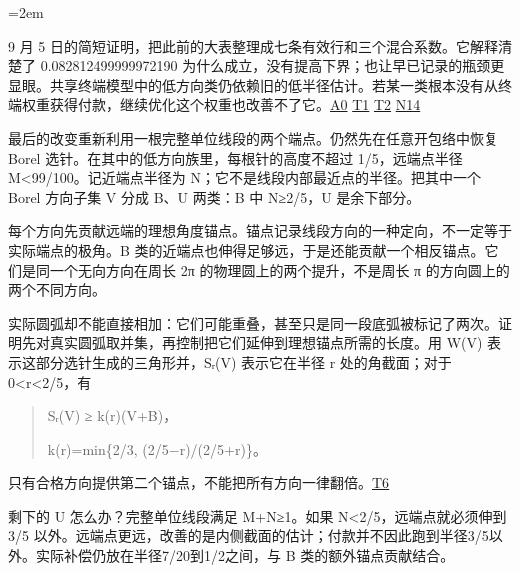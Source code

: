 {\emergencystretch=2em

9 月 5 日的简短证明，把此前的大表整理成七条有效行和三个混合系数。它解释清楚了 \allowbreak{}0.082812499999972190 为什么成立，没有提高下界；也让早已记录的瓶颈更显眼。共享终端模型中的低方向类仍依赖旧的低半径估计。若某一类根本没有从终端权重获得付款，继续优化这个权重也改善不了它。\href{https://github.com/subfish-zhou/star-shaped-kakeya-lean/blob/6432d8eb33cc2093ed5ca1f5e63390e4bf065fd0/history-sources/A0-baseline.md}{A0} \href{https://github.com/subfish-zhou/star-shaped-kakeya-lean/blob/6432d8eb33cc2093ed5ca1f5e63390e4bf065fd0/history/one-tenth/baseline/PROOF.md}{T1} \href{https://github.com/subfish-zhou/star-shaped-kakeya-lean/blob/6432d8eb33cc2093ed5ca1f5e63390e4bf065fd0/history/one-tenth/baseline/PROVENANCE.md}{T2} \href{https://github.com/subfish-zhou/star-shaped-kakeya-lean/blob/6432d8eb33cc2093ed5ca1f5e63390e4bf065fd0/history/shared-terminal-082812/class_independent_terminal_price_report_zh.md}{N14}

\par}

最后的改变重新利用一根完整单位线段的两个端点。仍然先在任意开包络中恢复 Borel 选针。在其中的低方向族里，每根针的高度不超过 1/5，远端点半径 M\textless99/100。记近端点半径为 N；它不是线段内部最近点的半径。把其中一个 Borel 方向子集 V 分成 B、U 两类：B 中 N≥2/5，U 是余下部分。

每个方向先贡献远端的理想角度锚点。锚点记录线段方向的一种定向，不一定等于实际端点的极角。B 类的近端点也伸得足够远，于是还能贡献一个相反锚点。它们是同一个无向方向在周长 2π 的物理圆上的两个提升，不是周长 π 的方向圆上的两个不同方向。

实际圆弧却不能直接相加：它们可能重叠，甚至只是同一段底弧被标记了两次。证明先对真实圆弧取并集，再控制把它们延伸到理想锚点所需的长度。用 W(V) 表示这部分选针生成的三角形并，Sᵣ(V) 表示它在半径 r 处的角截面；对于 0\textless r\textless2/5，有

\begin{quote}
\textbar Sᵣ(V)\textbar{} ≥ k(r)(\textbar V\textbar+\textbar B\textbar)，

k(r)=min\{2/3, (2/5−r)/(2/5+r)\}。
\end{quote}

只有合格方向提供第二个锚点，不能把所有方向一律翻倍。\href{https://github.com/subfish-zhou/star-shaped-kakeya-lean/blob/6432d8eb33cc2093ed5ca1f5e63390e4bf065fd0/history/one-tenth/low-source-b2/integrated-low/PROOF.md}{T6}

剩下的 U 怎么办？完整单位线段满足 M+N≥1。如果 N\textless2/5，远端点就必须伸到 3/5 以外。远端点更远，改善的是内侧截面的估计；付款并不因此跑到半径3/5以外。实际补偿仍放在半径7/20到1/2之间，与 B 类的额外锚点贡献结合。

